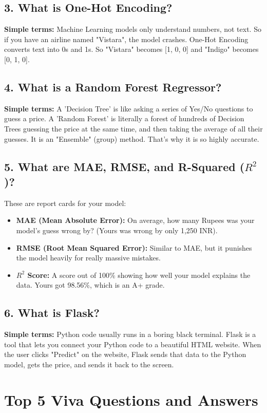 \documentclass[12pt]{article}
\begin{document}
\subsection*{3. What is One-Hot Encoding?}
\textbf{Simple terms:} Machine Learning models only understand numbers, not text. So if you have an airline named "Vistara", the model crashes. One-Hot Encoding converts text into 0s and 1s. So "Vistara" becomes [1, 0, 0] and "Indigo" becomes [0, 1, 0].

\subsection*{4. What is a Random Forest Regressor?}
\textbf{Simple terms:} A 'Decision Tree' is like asking a series of Yes/No questions to guess a price. A 'Random Forest' is literally a forest of hundreds of Decision Trees guessing the price at the same time, and then taking the average of all their guesses. It is an "Ensemble" (group) method. That's why it is so highly accurate.

\subsection*{5. What are MAE, RMSE, and R-Squared ($R^2$)?}
These are report cards for your model:
\begin{itemize}
    \item \textbf{MAE (Mean Absolute Error):} On average, how many Rupees was your model's guess wrong by? (Yours was wrong by only 1,250 INR).
    \item \textbf{RMSE (Root Mean Squared Error):} Similar to MAE, but it punishes the model heavily for really massive mistakes.
    \item \textbf{$R^2$ Score:} A score out of 100\% showing how well your model explains the data. Yours got 98.56\%, which is an A+ grade.
\end{itemize}

\subsection*{6. What is Flask?}
\textbf{Simple terms:} Python code usually runs in a boring black terminal. Flask is a tool that lets you connect your Python code to a beautiful HTML website. When the user clicks "Predict" on the website, Flask sends that data to the Python model, gets the price, and sends it back to the screen.

\section{Top 5 Viva Questions and Answers}
\end{document}
